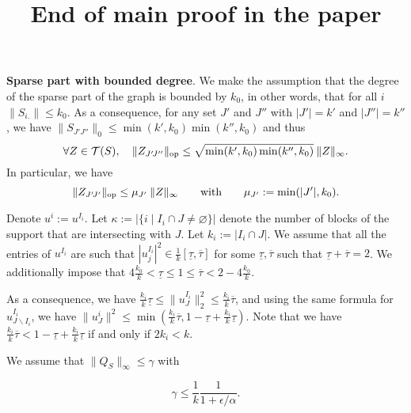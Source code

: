 \documentclass{article}
\title{End of main proof in the paper}
\date{}
\def\T{\mathcal{T}}
\def\op{{\rm op}}
\def\tauu{{\overline{\tau}}}
\def\taul{{\underline{\tau}}}
\begin{document}
\maketitle
\appendix

\textbf{Sparse part with bounded degree}. We make the assumption that the degree of the sparse part of the graph is bounded by $k_0$, in other words, that for all $i$ $\|S_{i.}\| \leq k_0$. As a consequence, for any set $J'$ and $J''$ with $|J'|=k'$ and $|J''|=k''$, we have $\|S_{J'\! J''}\|_0 \leq \min(k',k_0) \min(k'',k_0)$ and thus $$\forall Z \in \T(S), \quad  \|Z_{J'\! J''}\|_{\op} \leq \sqrt{\min(k',k_0) \min(k'',k_0)}  \: \|Z\|_{\infty}.$$
In particular, we have 
$$\|Z_{J'\! J'}\|_{\op} \leq \mu_{J'}  \: \|Z\|_{\infty} \qquad \text{with} \qquad \mu_{J'}:=\min(|J'|,k_0).$$


Denote $u^i:=u^{I_i}$. %
Let $\kappa:=|\{i \mid I_i \cap J \neq \varnothing\}|$ denote the number of blocks of the support that are intersecting with $J$. Let $k_i:=|I_i \cap J|$. We assume that all the entries of $u^{I_i}$ are such that $|u^{I_i}_j|^2 \in \frac{1}{k}[\taul, \tauu]$ for some  $\taul, \tauu$ such that $\taul+\tauu=2$. We additionally impose that $4 \frac{k_0}{k} < \taul \leq 1 \leq \tauu < 2-4 \frac{k_0}{k}$. 

As a consequence, we have $\frac{k_i}{k} \taul \leq \|u^{I_i}_J\|_2^2 \leq \frac{k_i}{k} \tauu$,
and using the same formula for $u^{I_i}_{J \backslash I_i}$, we have
$\|u^i_J\|^2 \leq \min (\frac{k_i}{k} \tauu, 1-\taul+\frac{k_i}{k} \taul)$. Note that we have $\frac{k_i}{k} \tauu < 1-\taul+\frac{k_i}{k} \taul$ if and only if $2k_i<k$. 

We assume that $\|Q_{S}\|_{\infty} \leq \gamma$ with 

$$\gamma \leq \frac{1}{k} \frac{1}{1+\epsilon/\alpha }.$$
\end{document}
